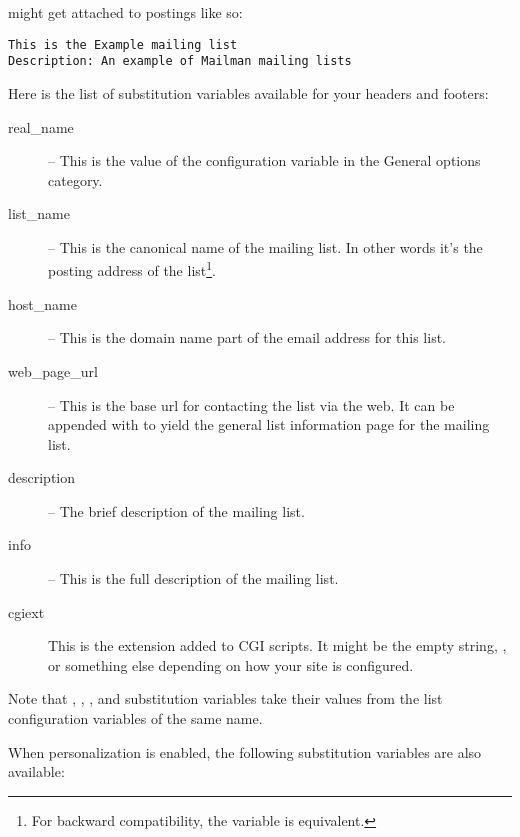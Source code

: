 \documentclass{howto}
\begin{document}
might get attached to postings like so:

\begin{verbatim}
This is the Example mailing list
Description: An example of Mailman mailing lists
\end{verbatim}

Here is the list of substitution variables available for your headers
and footers:

\begin{description}
\item[real_name] --
    This is the value of the  configuration variable
    in the General options category.

\item[list_name] --
    This is the canonical name of the mailing list.  In other words
    it's the posting address of the list\footnote{For backward
    compatibility, the variable  is
    equivalent.}.

\item[host_name] --
    This is the domain name part of the email address for this list.

\item[web_page_url] --
    This is the base url for contacting the list via the web.  It can
    be appended with  to yield the
    general list information page for the mailing list.

\item[description] --
    The brief description of the mailing list.

\item[info] --
    This is the full description of the mailing list.

\item[cgiext]
    This is the extension added to CGI scripts.  It might be the empty
    string, , or something else depending on how your site
    is configured.
\end{description}

Note that , , , and
 substitution variables take their values from the list
configuration variables of the same name.

When personalization is enabled, the following substitution variables
are also available:
\end{document}
